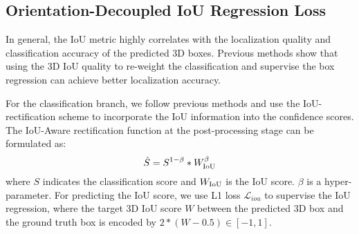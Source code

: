 \documentclass[runningheads]{llncs}
\begin{document}
\subsection{Orientation-Decoupled IoU Regression Loss}
In general, the IoU metric highly correlates with the localization quality and classification accuracy of the predicted 3D boxes. Previous methods \cite{liang2021rangeioudet}
show that using the 3D IoU quality to re-weight the classification and supervise the box regression can achieve better localization accuracy. 

For the classification branch, we follow previous methods \cite{Hu2021AFDetV2RT,zheng2020ciassd} and use the IoU-rectification scheme to incorporate the IoU information into the confidence scores.
The IoU-Aware rectification function \cite{Hu2021AFDetV2RT} at the post-processing stage can be formulated as:
\begin{equation}
\centering
\hat{S} = S^{1-\beta} * W_{\rm{IoU}}^{\beta}
\end{equation}
where $S$ indicates the classification score and $W_{\rm{IoU}}$ is the IoU score. $\beta$ is a hyper-parameter.
For predicting the IoU score, we use L1 loss $\mathcal{L}_{iou}$ to supervise the IoU regression, where the target 3D IoU score $W$ between the predicted 3D box and the ground truth box is encoded by $2 * (W - 0.5) \in [-1, 1]$.
\end{document}
